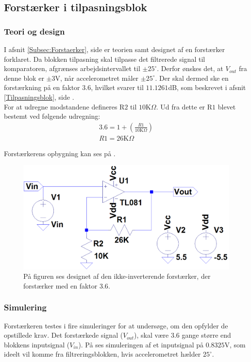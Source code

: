 \subsection{Forstærker i tilpasningsblok}\label{Forstaerker_faktor3_afs}
\subsubsection{Teori og design}
I afsnit \ref{Subsec:Forstaerker}, side \pageref{Subsec:Forstaerker} er teorien samt designet af en forstærker forklaret. Da blokken tilpasning skal tilpasse det filtrerede signal til komparatoren, afgrænses arbejdsintervallet til $\pm25^{\circ}$. Derfor ønskes det, at $V_{out}$ fra denne blok er $\pm3$V, når accelerometret måler $\pm25^{\circ}$. Der skal dermed ske en forstærkning på en faktor $3.6$, hvilket svarer til $11.1261$dB, som beskrevet i afsnit \ref{Tilpasningsblok}, side \pageref{Tilpasningsblok}. \\
For at udregne modstandene defineres R$2$ til $10$K$\Omega$. Ud fra dette er R$1$ blevet bestemt ved følgende udregning:
\begin{eqnarray}
3.6 = 1 + (\frac{R1}{10\text{K}\Omega}) \\
R1 = 26\text{K}\Omega
\end{eqnarray}

\noindent Forstærkerens opbygning kan ses på .
\begin{figure}[H]
	\centering
	\includegraphics[scale=0.35]{figures/cProblemloesning/Forstaerker_faktor3.PNG}
	\caption{På figuren ses designet af den ikke-inverterende forstærker, der forstærker med en faktor $3.6$.}
	\label{fig:Forstaerker_faktor3}
\end{figure}

\subsubsection{Simulering}
Forstærkeren testes i fire simuleringer for at undersøge, om den opfylder de opstillede krav. Det forstærkede signal ($V_{out}$), skal være $3.6$ gange større end blokkens inputsignal ($V_{in}$). På  ses simuleringen af et inputsignal på $0.8325$V, som ideelt vil komme fra filtreringsblokken, hvis accelerometret hælder $25^{\circ}$.

